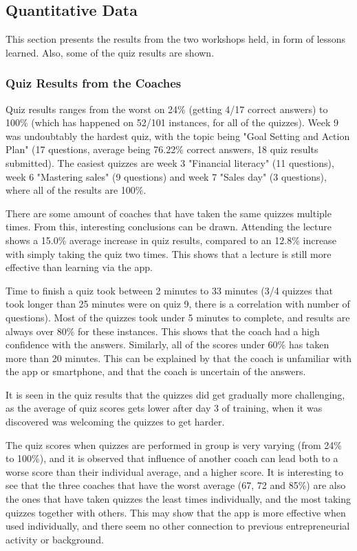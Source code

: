 \subsection{Quantitative Data}


    This section presents the results from the two workshops held, in form of lessons learned. Also, some of the quiz results are shown.

    \subsubsection{Quiz Results from the Coaches}

    Quiz results ranges from the worst on 24\% (getting 4/17 correct answers) to 100\% (which has happened on 52/101 instances, for all of the quizzes). Week 9 was undoubtably the hardest quiz, with the topic being "Goal Setting and Action Plan" (17 questions, average being 76.22\% correct answers, 18 quiz results submitted). The easiest quizzes are week 3 "Financial literacy" (11 questions), week 6 "Mastering sales" (9 questions) and week 7 "Sales day" (3 questions), where all of the results are 100\%.

    There are some amount of coaches that have taken the same quizzes multiple times. From this, interesting conclusions can be drawn. Attending the lecture shows a 15.0\% average increase in quiz results, compared to an 12.8\% increase with simply taking the quiz two times. This shows that a lecture is still more effective than learning via the app.

    Time to finish a quiz took between 2 minutes to 33 minutes (3/4 quizzes that took longer than 25 minutes were on quiz 9, there is a correlation with number of questions). Most of the quizzes took under 5 minutes to complete, and results are always over 80\% for these instances. This shows that the coach had a high confidence with the answers. Similarly, all of the scores under 60\% has taken more than 20 minutes. This can be explained by that the coach is unfamiliar with the app or smartphone, and that the coach is uncertain of the answers.

    It is seen in the quiz results that the quizzes did get gradually more challenging, as the average of quiz scores gets lower after day 3 of training, when it was discovered was welcoming the quizzes to get harder.

    The quiz scores when quizzes are performed in group is very varying (from 24\% to 100\%), and it is observed that influence of another coach can lead both to a worse score than their individual average, and a higher score. It is interesting to see that the three coaches that have the worst average (67, 72 and 85\%) are also the ones that have taken quizzes the least times individually, and the most taking quizzes together with others. This may show that the app is more effective when used individually, and there seem no other connection to previous entrepreneurial activity or background.

